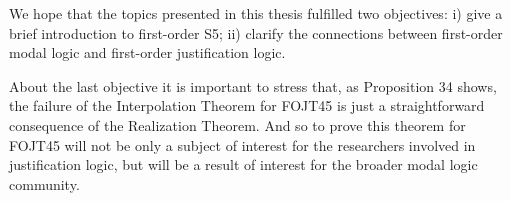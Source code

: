 \vspace{10mm}

\qquad We hope that the topics presented in this thesis fulfilled two objectives: i) give a brief introduction to first-order S5; ii) clarify the connections between first-order modal logic and first-order justification logic.

\qquad About the last objective it is important to stress that, as Proposition 34 shows, the failure of the Interpolation Theorem for FOJT45 is just a straightforward consequence of the Realization Theorem. And so to prove this theorem for FOJT45 will not be only a subject of interest for the researchers involved in justification logic, but will be a result of interest for the broader modal logic community. 


